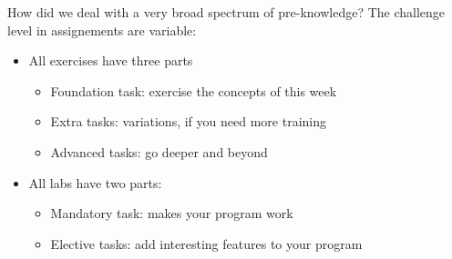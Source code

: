 \documentclass[aspectratio=169]{beamer}
\newenvironment{Slide}[1]%
  {\begin{frame}[environment=Slide]{#1}}
  {\end{frame}}%
\begin{document}
\begin{Slide}{How did we deal with a very broad spectrum of pre-knowledge?}
  The challenge level in assignements are variable: 
  \begin{itemize}
    \item All exercises have three parts 
    \begin{itemize}
      \item Foundation task: exercise the concepts of this week 
      \item Extra tasks: variations, if you need more training
      \item Advanced tasks: go deeper and beyond
    \end{itemize}
    \item All labs have two parts:   
    \begin{itemize}
      \item Mandatory task: makes your program work 
      \item Elective tasks: add interesting features to your program 
    \end{itemize}  
  \end{itemize}
\end{Slide}
\end{document}
